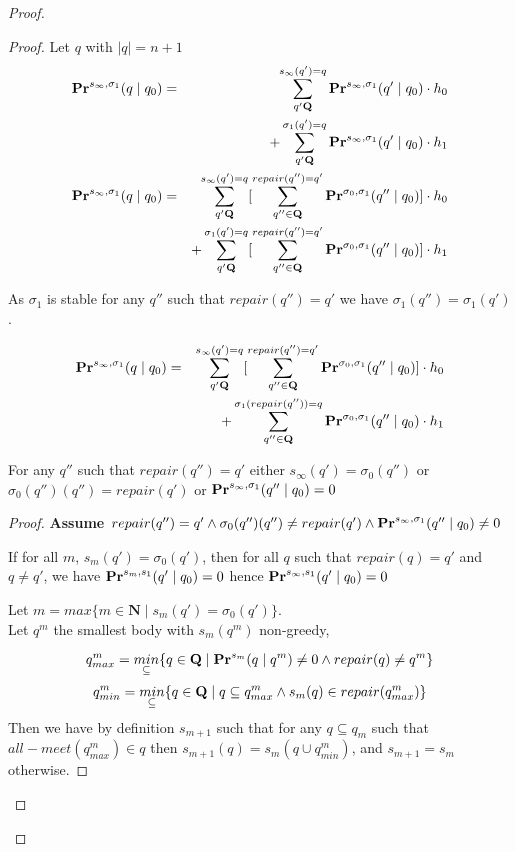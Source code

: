 \begin{proof}
\begin{proof}
		Let $q$ with $|q| = n+1$
		\begin{eqnarray*}
			\mathbf{Pr}^{s_{\infty},\sigma_1}(q \mid q_0)  & =& \sum_{q' \mathbf{Q}}^{s_{\infty}(q') = q} \mathbf{Pr}^{s_{\infty},\sigma_1}(q'\mid q_0) \cdot h_0\\
			& & + \sum_{q' \mathbf{Q}}^{\sigma_1(q') = q}  \mathbf{Pr}^{s_{\infty},\sigma_1}(q'\mid q_0) \cdot h_1 \\
			\mathbf{Pr}^{s_{\infty},\sigma_1}(q \mid q_0)  & =& \sum_{q' \mathbf{Q}}^{s_{\infty}(q') = q} [ \sum_{q''\in \mathbf{Q}}^{repair(q'') = q'} \mathbf{Pr}^{\sigma_0,\sigma_1}(q'' \mid q_0)] \cdot h_0\\
			& & + \sum_{q' \mathbf{Q}}^{\sigma_1(q') = q}  [ \sum_{q''\in \mathbf{Q}}^{repair(q'') = q'} \mathbf{Pr}^{\sigma_0,\sigma_1}(q'' \mid q_0)] \cdot h_1 \\
		\end{eqnarray*}
		
		As $\sigma_1$ is stable for any $q''$ such that $repair(q'') = q'$ we have $\sigma_1(q'') = \sigma_1(q')$.
		
		\begin{eqnarray*}
			\mathbf{Pr}^{s_{\infty},\sigma_1}(q \mid q_0)  & =& \sum_{q' \mathbf{Q}}^{s_{\infty}(q') = q} [ \sum_{q''\in \mathbf{Q}}^{repair(q'') = q'} \mathbf{Pr}^{\sigma_0,\sigma_1}(q'' \mid q_0)] \cdot h_0\\
			& & +  \sum_{q''\in \mathbf{Q}}^{\sigma_1(repair(q'')) = q} \mathbf{Pr}^{\sigma_0,\sigma_1}(q'' \mid q_0) \cdot h_1\\
		\end{eqnarray*}
		
		\begin{mylem}
			\label{lemmarep}
			For any $q''$ such that $repair(q'') = q'$ either $s_{\infty}(q') = \sigma_0(q'')$ or $\sigma_0(q'')(q'') = repair(q')$ or $\mathbf{Pr}^{s_{\infty},\sigma_1}(q'' \mid q_0) = 0$
		\end{mylem}
		\begin{proof}
			
			\textbf{Assume $repair(q'') = q'  \land \sigma_0(q'')(q'') \neq repair(q') \land \mathbf{Pr}^{s_{\infty},\sigma_1}(q'' \mid q_0) \neq 0$}
			
			If for all $m$, $s_m(q') = \sigma_0(q')$, then for all $q$ such that $repair(q) = q'$ and $q \neq q'$, we have $\mathbf{Pr}^{s_{m},s_1}(q' \mid q_0) = 0$ hence $\mathbf{Pr}^{s_{\infty},s_1}(q' \mid q_0) = 0$
			
			Let $m = max \{m \in \mathbf{N} \mid s_m(q') = \sigma_0(q') \}$.
			\\Let $q^m$  the smallest body with $s_m(q^m)$ non-greedy, 
			
			$$q^m_{max} = \underset{\subseteq}{min}\{q \in \mathbf{Q} \mid  \mathbf{Pr}^{s_m}(q\mid q^m)\neq 0 \land repair(q) \neq q^m \}$$
			$$q^m_{min} = \underset{\subseteq}{min}\{q \in \mathbf{Q} \mid  q \subseteq q^m_{max} \land s_m(q) \in repair(q^m_{max}) \}$$
			Then we have by definition $s_{m+1}$ such that for any $q \subseteq q_m$ such that $all-meet(q^m_{max}) \in q$ then $s_{m+1}(q) = s_m(q \cup q^m_{min})$, and $s_{m+1} = s_m$ otherwise.
			

\end{proof}
\end{proof}
\end{proof}
